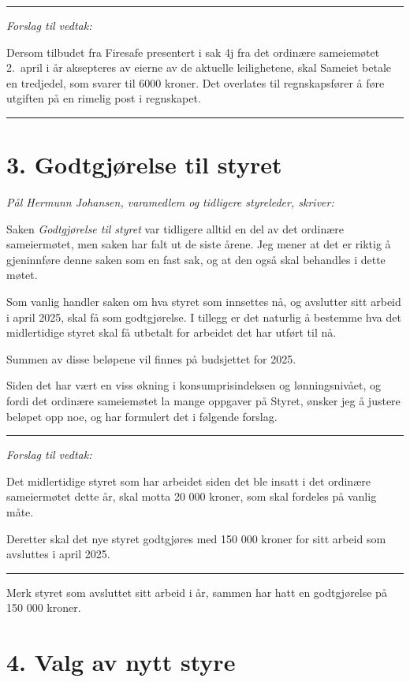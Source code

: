 \documentclass[12pt]{article}
\begin{document}
{\rule{\textwidth}{0.3pt}}

{\em Forslag til vedtak:}

Dersom tilbudet fra Firesafe presentert i sak 4j fra det ordinære sameiemøtet 2.\ april i år
aksepteres av eierne av de aktuelle leilighetene, skal Sameiet betale en tredjedel, som svarer til
6000 kroner. Det overlates til regnskapsfører å føre utgiften på en rimelig post i regnskapet.

{\rule{\textwidth}{0.3pt}}

\section*{3. Godtgjørelse til styret}

{\it Pål Hermunn Johansen, varamedlem og tidligere styreleder, skriver:}

Saken {\it Godtgjørelse til styret} var tidligere alltid en del av det ordinære sameiermøtet, men
saken har falt ut de siste årene. Jeg mener at det er riktig å gjeninnføre denne saken som en fast
sak, og at den også skal behandles i dette møtet.

Som vanlig handler saken om hva styret som innsettes nå, og avslutter sitt arbeid i april 2025,
skal få som godtgjørelse. I tillegg er det naturlig å bestemme hva det midlertidige styret skal få
utbetalt for arbeidet det har utført til nå.

Summen av disse beløpene vil finnes på budsjettet for 2025.

Siden det har vært en viss økning i konsumprisindeksen og lønningsnivået, og fordi det ordinære
sameiemøtet la mange oppgaver på Styret, ønsker jeg å justere beløpet opp noe, og har formulert det
i følgende forslag.

{\rule{\textwidth}{0.3pt}}

{\em Forslag til vedtak:}

Det midlertidige styret som har arbeidet siden det ble insatt i det ordinære sameiermøtet dette år,
skal motta 20 000 kroner, som skal fordeles på vanlig måte.

Deretter skal det nye styret godtgjøres med 150 000 kroner for sitt arbeid som avsluttes i april
2025.

{\rule{\textwidth}{0.3pt}}

Merk styret som avsluttet sitt arbeid i år, sammen har hatt en godtgjørelse på 150 000 kroner.

\section*{4. Valg av nytt styre}
\end{document}
